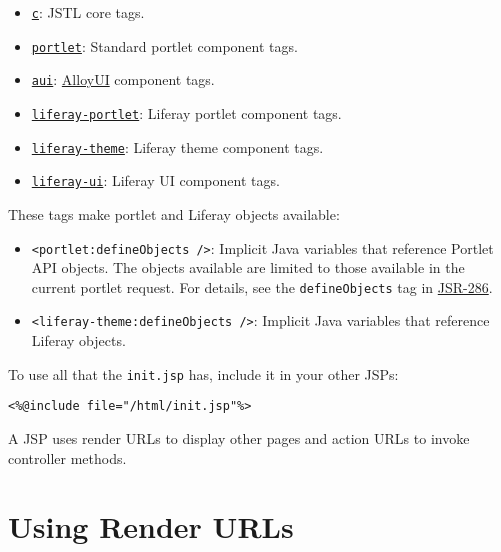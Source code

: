 \begin{itemize}
\tightlist
\item
  \href{https://docs.liferay.com/ce/portal/7.2-latest/taglibs/util-taglib/c/tld-frame.html}{\texttt{c}}:
  JSTL core tags.
\item
  \href{https://docs.liferay.com/ce/portal/7.2-latest/taglibs/util-taglib/portlet/tld-frame.html}{\texttt{portlet}}:
  Standard portlet component tags.
\item
  \href{https://docs.liferay.com/ce/portal/7.2-latest/taglibs/util-taglib/aui/tld-summary.html}{\texttt{aui}}:
  \href{https://alloyui.com/}{AlloyUI} component tags.
\item
  \href{https://docs.liferay.com/ce/portal/7.2-latest/taglibs/util-taglib/liferay-portlet/tld-frame.html}{\texttt{liferay-portlet}}:
  Liferay portlet component tags.
\item
  \href{https://docs.liferay.com/ce/portal/7.2-latest/taglibs/util-taglib/liferay-theme/tld-frame.html}{\texttt{liferay-theme}}:
  Liferay theme component tags.
\item
  \href{https://docs.liferay.com/ce/portal/7.2-latest/taglibs/util-taglib/liferay-ui/tld-frame.html}{\texttt{liferay-ui}}:
  Liferay UI component tags.
\end{itemize}

These tags make portlet and Liferay objects available:

\begin{itemize}
\item
  \texttt{\textless{}portlet:defineObjects\ /\textgreater{}}: Implicit
  Java variables that reference Portlet API objects. The objects
  available are limited to those available in the current portlet
  request. For details, see the \texttt{defineObjects} tag in
  \href{https://jcp.org/en/jsr/detail?id=286}{JSR-286}.
\item
  \texttt{\textless{}liferay-theme:defineObjects\ /\textgreater{}}:
  Implicit Java variables that reference Liferay objects.
\end{itemize}

To use all that the \texttt{init.jsp} has, include it in your other
JSPs:

\begin{verbatim}
<%@include file="/html/init.jsp"%>
\end{verbatim}

A JSP uses render URLs to display other pages and action URLs to invoke
controller methods.

\section{Using Render URLs}\label{using-render-urls}

